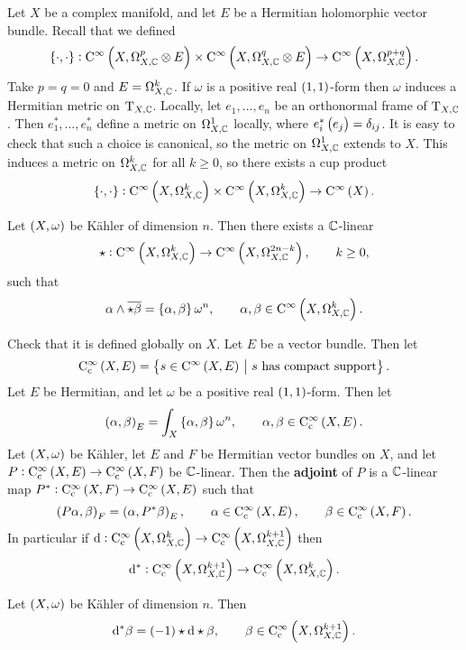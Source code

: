 Let $ X $ be a complex manifold, and let $ E $ be a Hermitian holomorphic vector bundle. Recall that we defined
$$ \cbr{\cdot, \cdot} : \C^\infty\br{X, \Omega_{X, \CC}^p \otimes E} \times \C^\infty\br{X, \Omega_{X, \CC}^q \otimes E} \to \C^\infty\br{X, \Omega_{X, \CC}^{p + q}}. $$
Take $ p = q = 0 $ and $ E = \Omega_{X, \mathbb{C}}^k $. If $ \omega $ is a positive real $ \br{1, 1} $-form then $ \omega $ induces a Hermitian metric on $ \mathrm{T}_{X, \mathbb{C}} $. Locally, let $ e_1, \dots, e_n $ be an orthonormal frame of $ \mathrm{T}_{X, \mathbb{C}} $. Then $ e_1^*, \dots, e_n^* $ define a metric on $ \Omega_{X, \mathbb{C}}^1 $ locally, where $ e_i^*\br{e_j} = \delta_{ij} $. It is easy to check that such a choice is canonical, so the metric on $ \Omega_{X, \mathbb{C}}^1 $ extends to $ X $. This induces a metric on $ \Omega_{X, \mathbb{C}}^k $ for all $ k \ge 0 $, so there exists a cup product
$$ \cbr{\cdot, \cdot} : \C^\infty\br{X, \Omega_{X, \CC}^k} \times \C^\infty\br{X, \Omega_{X, \CC}^k} \to \C^\infty\br{X}. $$

\begin{lemma}
Let $ \br{X, \omega} $ be K\"ahler of dimension $ n $. Then there exists a $ \mathbb{C} $-linear
$$ \star : \C^\infty\br{X, \Omega_{X, \CC}^k} \to \C^\infty\br{X, \Omega_{X, \CC}^{2n - k}}, \qquad k \ge 0, $$
such that
$$ \alpha \wedge \overline{\star\beta} = \cbr{\alpha, \beta}\omega^n, \qquad \alpha, \beta \in \C^\infty\br{X, \Omega_{X, \CC}^k}. $$
\end{lemma}

Check that it is defined globally on $ X $. Let $ E $ be a vector bundle. Then let
$$ \C_\c^\infty\br{X, E} = \cbr{s \in \C^\infty\br{X, E} \st s \ \text{has compact support}}. $$
Let $ E $ be Hermitian, and let $ \omega $ be a positive real $ \br{1, 1} $-form. Then let
$$ \br{\alpha, \beta}_E = \int_X \cbr{\alpha, \beta}\omega^n, \qquad \alpha, \beta \in \C_\c^\infty\br{X, E}. $$
Let $ \br{X, \omega} $ be K\"ahler, let $ E $ and $ F $ be Hermitian vector bundles on $ X $, and let $ P : \C_\c^\infty\br{X, E} \to \C_\c^\infty\br{X, F} $ be $ \mathbb{C} $-linear. Then the \textbf{adjoint} of $ P $ is a $ \mathbb{C} $-linear map $ P^* : \C_\c^\infty\br{X, F} \to \C_\c^\infty\br{X, E} $ such that
$$ \br{P\alpha, \beta}_F = \br{\alpha, P^*\beta}_E, \qquad \alpha \in \C_\c^\infty\br{X, E}, \qquad \beta \in \C_\c^\infty\br{X, F}. $$
In particular if $ \d : \C_\c^\infty\br{X, \Omega_{X, \CC}^k} \to \C_\c^\infty\br{X, \Omega_{X, \CC}^{k + 1}} $ then
$$ \d^* : \C_\c^\infty\br{X, \Omega_{X, \CC}^{k + 1}} \to \C_\c^\infty\br{X, \Omega_{X, \CC}^k}. $$

\begin{lemma}
\label{lem:6.11}
Let $ \br{X, \omega} $ be K\"ahler of dimension $ n $. Then
$$ \d^*\beta = \br{-1}\star\d\star\beta, \qquad \beta \in \C_\c^\infty\br{X, \Omega_{X, \CC}^{k + 1}}. $$
\end{lemma}

